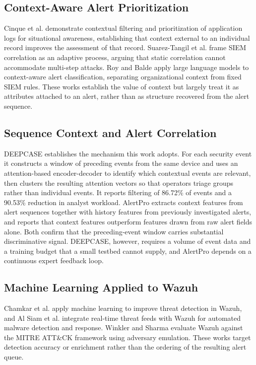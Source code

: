 \documentclass[conference]{IEEEtran}
\begin{document}
\subsection{Context-Aware Alert Prioritization}

Cinque et al. \cite{ref7} demonstrate contextual filtering and prioritization of application logs for situational awareness, establishing that context external to an individual record improves the assessment of that record. Suarez-Tangil et al. \cite{ref6} frame SIEM correlation as an adaptive process, arguing that static correlation cannot accommodate multi-step attacks. Roy and Balde \cite{ref1} apply large language models to context-aware alert classification, separating organizational context from fixed SIEM rules. These works establish the value of context but largely treat it as attributes attached to an alert, rather than as structure recovered from the alert sequence.

\subsection{Sequence Context and Alert Correlation}

DEEPCASE \cite{ref15} establishes the mechanism this work adopts. For each security event it constructs a window of preceding events from the same device and uses an attention-based encoder-decoder to identify which contextual events are relevant, then clusters the resulting attention vectors so that operators triage groups rather than individual events. It reports filtering of 86.72\% of events and a 90.53\% reduction in analyst workload. AlertPro \cite{ref5} extracts context features from alert sequences together with history features from previously investigated alerts, and reports that context features outperform features drawn from raw alert fields alone. Both confirm that the preceding-event window carries substantial discriminative signal. DEEPCASE, however, requires a volume of event data and a training budget that a small testbed cannot supply, and AlertPro depends on a continuous expert feedback loop.

\subsection{Machine Learning Applied to Wazuh}

Chamkar et al. \cite{ref13} apply machine learning to improve threat detection in Wazuh, and Al Siam et al. \cite{ref3} integrate real-time threat feeds with Wazuh for automated malware detection and response. Winkler and Sharma \cite{ref12} evaluate Wazuh against the MITRE ATT\&CK framework using adversary emulation. These works target detection accuracy or enrichment rather than the ordering of the resulting alert queue.
\end{document}
